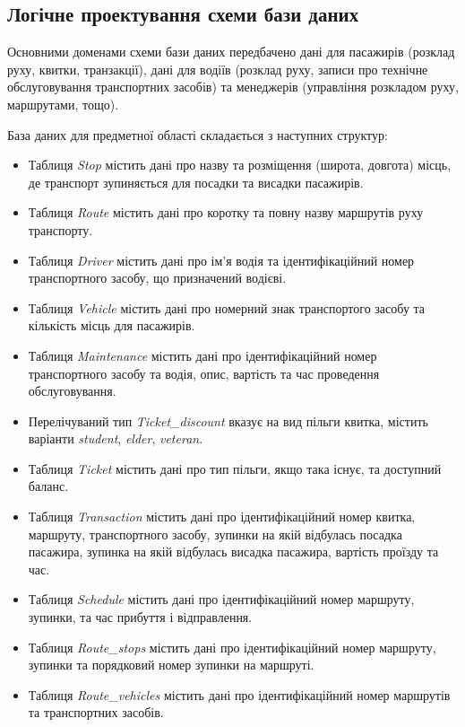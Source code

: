 \documentclass[oneside,14pt]{extarticle}
\begin{document}
\subsection{Логічне проектування схеми бази даних}
Основними доменами схеми бази даних передбачено дані для пасажирів (розклад руху, квитки, транзакції), дані для водіїв (розклад руху, записи про технічне обслуговування транспортних засобів) та менеджерів (управління розкладом руху, маршрутами, тощо).

База даних для предметної області складається з наступних структур:
\begin{itemize}
\item Таблиця \textit{Stop} містить дані про назву та розміщення (широта, довгота) місць, де транспорт зупиняється для посадки та висадки пасажирів.
\item Таблиця \textit{Route} містить дані про коротку та повну назву маршрутів руху транспорту.
\item Таблиця \textit{Driver} містить дані про ім'я водія та ідентифікаційний номер транспортного засобу, що призначений водієві.
\item Таблиця \textit{Vehicle} містить дані про номерний знак транспортого засобу та кількість місць для пасажирів.
\item Таблиця \textit{Maintenance} містить дані про ідентифікаційний номер транспортного засобу та водія, опис, вартість та час проведення обслуговування.
\item Перелічуваний тип \textit{Ticket\_discount} вказує на вид пільги квитка, містить варіанти \textit{student}, \textit{elder}, \textit{veteran}.
\item Таблиця \textit{Ticket} містить дані про тип пільги, якщо така існує, та доступний баланс.
\item Таблиця \textit{Transaction} містить дані про ідентифікаційний номер квитка, маршруту, транспортного засобу, зупинки на якій відбулась посадка пасажира, зупинка на якій відбулась висадка пасажира, вартість проїзду  та час.
\item Таблиця \textit{Schedule} містить дані про ідентифікаційний номер маршруту, зупинки, та час прибуття і відправлення.
\item Таблиця \textit{Route\_stops} містить дані про ідентифікаційний номер маршруту, зупинки та порядковий номер зупинки на маршруті.
\item Таблиця \textit{Route\_vehicles} містить дані про ідентифікаційний номер маршрутів та транспортних засобів.
\end{itemize}
\end{document}
